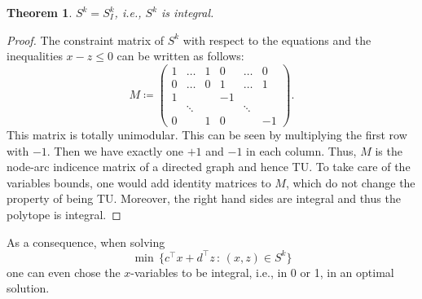\documentclass[10pt, a4paper]{article}
\newcommand{\suchthat}{\,:\,}
\newcommand{\define}{\coloneqq}
\newcommand{\T}{^{\top}}
\newtheorem{theorem}{Theorem}
\begin{document}
\begin{theorem}
  $S^k = S^k_I$, i.e., $S^k$ is integral.
\end{theorem}

\begin{proof}
  The constraint matrix of $S^k$ with respect to the equations and the
  inequalities $x - z \leq 0$ can be written as follows:
  \[
    M \define
    \begin{pmatrix}
      1 & \dots & 1 & 0 & \dots & 0 \\
      0 & \dots & 0 & 1 & \dots & 1 \\
      1 &       &   & -1 &      &   \\
        & \ddots&   &    & \ddots & \\
      0 &       & 1 & 0 &      & -1
    \end{pmatrix}.
  \]
  This matrix is totally unimodular. This can be seen by multiplying the
  first row with $-1$. Then we have exactly one $+1$ and $-1$ in each
  column. Thus, $M$ is the node-arc indicence matrix of a directed graph
  and hence TU. To take care of the variables bounds, one would add
  identity matrices to $M$, which do not change the property of being
  TU. Moreover, the right hand sides are integral and thus the polytope is
  integral.
\end{proof}

As a consequence, when solving
\[
  \min\, \{ c\T x + d\T z \suchthat (x,z) \in S^k \}
\]
one can even chose the $x$-variables to be integral, i.e., in 0 or 1, in an
optimal solution.
\end{document}
